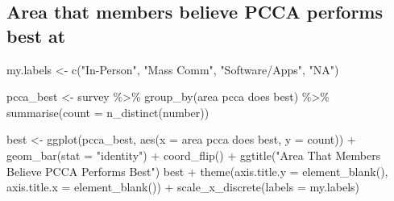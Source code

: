 \documentclass[
]{article}
\newenvironment{Shaded}{\begin{snugshade}}{\end{snugshade}}
\newcommand{\AttributeTok}[1]{\textcolor[rgb]{0.77,0.63,0.00}{#1}}
\newcommand{\FunctionTok}[1]{\textcolor[rgb]{0.00,0.00,0.00}{#1}}
\newcommand{\NormalTok}[1]{#1}
\newcommand{\OtherTok}[1]{\textcolor[rgb]{0.56,0.35,0.01}{#1}}
\newcommand{\SpecialCharTok}[1]{\textcolor[rgb]{0.00,0.00,0.00}{#1}}
\newcommand{\StringTok}[1]{\textcolor[rgb]{0.31,0.60,0.02}{#1}}
\begin{document}
\hypertarget{area-that-members-believe-pcca-performs-best-at}{%
\subsection{Area that members believe PCCA performs best
at}\label{area-that-members-believe-pcca-performs-best-at}}

\begin{Shaded}
\begin{Highlighting}[]
\NormalTok{my.labels }\OtherTok{\textless{}{-}} \FunctionTok{c}\NormalTok{(}\StringTok{"In{-}Person"}\NormalTok{, }\StringTok{"Mass Comm"}\NormalTok{, }\StringTok{"Software/Apps"}\NormalTok{, }\StringTok{"NA"}\NormalTok{)}
\end{Highlighting}
\end{Shaded}

\begin{Shaded}
\begin{Highlighting}[]
\NormalTok{pcca\_best }\OtherTok{\textless{}{-}}\NormalTok{ survey }\SpecialCharTok{\%\textgreater{}\%}
    \FunctionTok{group\_by}\NormalTok{(}\StringTok{\textasciigrave{}}\AttributeTok{area pcca does best}\StringTok{\textasciigrave{}}\NormalTok{) }\SpecialCharTok{\%\textgreater{}\%}
    \FunctionTok{summarise}\NormalTok{(}\AttributeTok{count =} \FunctionTok{n\_distinct}\NormalTok{(number))}

\NormalTok{best }\OtherTok{\textless{}{-}} \FunctionTok{ggplot}\NormalTok{(pcca\_best, }\FunctionTok{aes}\NormalTok{(}\AttributeTok{x =} \StringTok{\textasciigrave{}}\AttributeTok{area pcca does best}\StringTok{\textasciigrave{}}\NormalTok{, }\AttributeTok{y =}\NormalTok{ count)) }\SpecialCharTok{+}
    \FunctionTok{geom\_bar}\NormalTok{(}\AttributeTok{stat =} \StringTok{"identity"}\NormalTok{) }\SpecialCharTok{+} \FunctionTok{coord\_flip}\NormalTok{() }\SpecialCharTok{+} \FunctionTok{ggtitle}\NormalTok{(}\StringTok{"Area That Members Believe PCCA Performs Best"}\NormalTok{)}
\NormalTok{best }\SpecialCharTok{+} \FunctionTok{theme}\NormalTok{(}\AttributeTok{axis.title.y =} \FunctionTok{element\_blank}\NormalTok{(), }\AttributeTok{axis.title.x =} \FunctionTok{element\_blank}\NormalTok{()) }\SpecialCharTok{+}
    \FunctionTok{scale\_x\_discrete}\NormalTok{(}\AttributeTok{labels =}\NormalTok{ my.labels)}
\end{Highlighting}
\end{Shaded}
\end{document}
